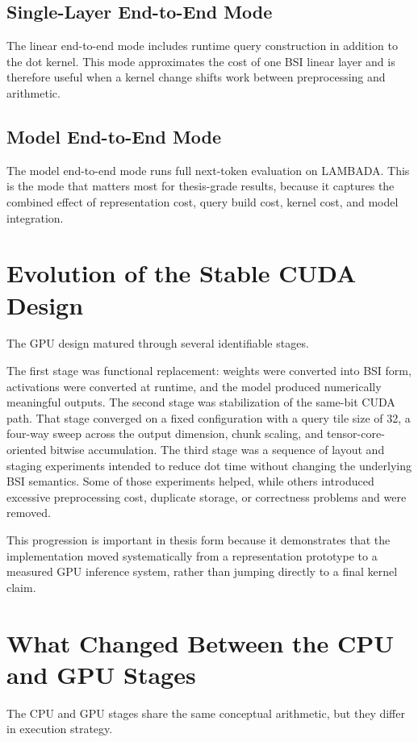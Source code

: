 \subsection{Single-Layer End-to-End Mode}
The linear end-to-end mode includes runtime query construction in addition to the dot kernel. This mode approximates the cost of one BSI linear layer and is therefore useful when a kernel change shifts work between preprocessing and arithmetic.

\subsection{Model End-to-End Mode}
The model end-to-end mode runs full next-token evaluation on LAMBADA. This is the mode that matters most for thesis-grade results, because it captures the combined effect of representation cost, query build cost, kernel cost, and model integration.

\section{Evolution of the Stable CUDA Design}
The GPU design matured through several identifiable stages.

The first stage was functional replacement: weights were converted into BSI form, activations were converted at runtime, and the model produced numerically meaningful outputs. The second stage was stabilization of the same-bit CUDA path. That stage converged on a fixed configuration with a query tile size of 32, a four-way sweep across the output dimension, chunk scaling, and tensor-core-oriented bitwise accumulation. The third stage was a sequence of layout and staging experiments intended to reduce dot time without changing the underlying BSI semantics. Some of those experiments helped, while others introduced excessive preprocessing cost, duplicate storage, or correctness problems and were removed.

This progression is important in thesis form because it demonstrates that the implementation moved systematically from a representation prototype to a measured GPU inference system, rather than jumping directly to a final kernel claim.

\section{What Changed Between the CPU and GPU Stages}
The CPU and GPU stages share the same conceptual arithmetic, but they differ in execution strategy.

